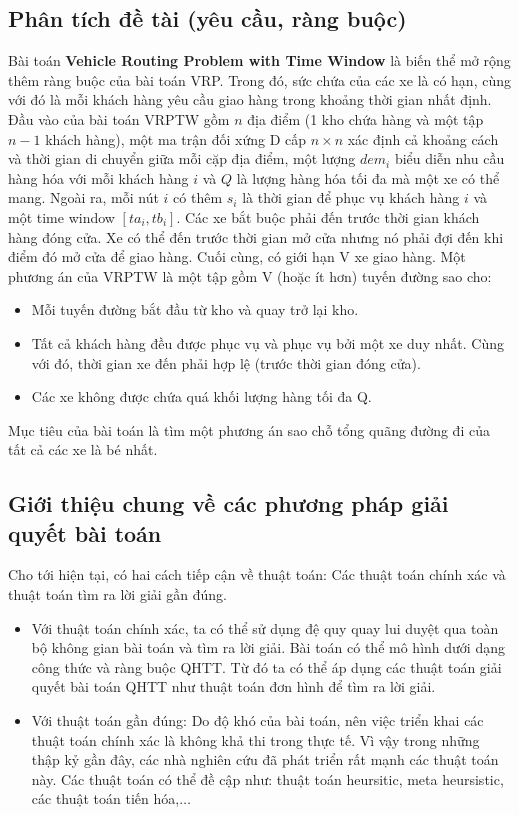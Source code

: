 \documentclass[12pt,a4paper]{article}\author{Nguyễn Nho Dũng}
\newcommand{\kniem}[1]{{\sffamily\bfseries #1}}
\newcommand{\ngoacvuong}[1]{\left[#1\right]}
\begin{document}
\subsection{Phân tích đề tài (yêu cầu, ràng buộc)}
Bài toán \kniem{Vehicle Routing Problem with Time Window} là biến thể mở rộng thêm ràng buộc của bài toán VRP. Trong đó, sức chứa của các xe là có hạn, cùng với đó là mỗi khách hàng yêu cầu giao hàng trong khoảng thời gian nhất định. \\[5pt]
Đầu vào của bài toán VRPTW gồm $n$ địa điểm (1 kho chứa hàng và một tập $n-1$ khách hàng), một ma trận đối xứng D cấp $n\times n$ xác định cả khoảng cách và thời gian di chuyển giữa mỗi cặp địa điểm, một lượng $dem_i$ biểu diễn nhu cầu hàng hóa với mỗi khách hàng $i$ và $Q$ là lượng hàng hóa tối đa mà một xe có thể mang. Ngoài ra, mỗi nút $i$ có thêm $s_i$ là thời gian để phục vụ khách hàng $i$ và một time window $\ngoacvuong{ta_i, tb_i}$. Các xe bắt buộc phải đến trước thời gian khách hàng đóng cửa. Xe có thể đến trước thời gian mở cửa nhưng nó phải đợi đến khi điểm đó mở cửa để giao hàng.  Cuối cùng, có giới hạn V xe giao hàng. Một phương án của VRPTW là một tập gồm V (hoặc ít hơn) tuyến đường sao cho:
\begin{itemize}
	\item Mỗi tuyến đường bắt đầu từ kho và quay trở lại kho.
	\item Tất cả khách hàng đều được phục vụ và phục vụ bởi một xe duy nhất. Cùng với đó, thời gian xe đến phải hợp lệ (trước thời gian đóng cửa).
	\item Các xe không được chứa quá khối lượng hàng tối đa Q.
\end{itemize}
Mục tiêu của bài toán là tìm một phương án sao chỗ tổng quãng đường đi của tất cả các xe là bé nhất.
\subsection{Giới thiệu chung về các phương pháp giải quyết bài toán}
Cho tới hiện tại, có hai cách tiếp cận về thuật toán: Các thuật toán chính xác và thuật toán tìm ra lời giải gần đúng.
\begin{itemize}
	\item Với thuật toán chính xác, ta có thể sử dụng đệ quy quay lui duyệt qua toàn bộ không gian bài toán và tìm ra lời giải. Bài toán có thể mô hình dưới dạng công thức và ràng buộc QHTT. Từ đó ta có thể áp dụng các thuật toán giải quyết bài toán QHTT như thuật toán đơn hình để tìm ra lời giải. 
	\item Với thuật toán gần đúng: Do độ khó của bài toán, nên việc triển khai các thuật toán chính xác là không khả thi trong thực tế. Vì vậy trong những thập kỷ gần đây, các nhà nghiên cứu đã phát triển rất mạnh các thuật toán này. Các thuật toán có thể đề cập như: thuật toán heursitic, meta heursistic, các thuật toán tiến hóa,$\ldots$
\end{itemize}
\end{document}
